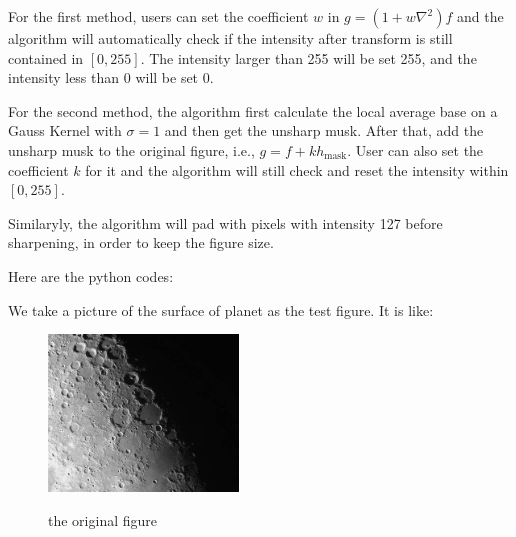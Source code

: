 \documentclass{article}
\begin{document}
For the first method, users can set the coefficient $w$ in $g = (1+w\nabla^2)f$
and the algorithm will automatically check if the intensity after transform 
is still contained in $[0,255]$. The intensity larger than 255 will be set 255,
and the intensity less than 0 will be set 0.

For the second method, the algorithm first calculate the local average base on 
a Gauss Kernel with $\sigma=1$ and then get the unsharp musk. 
After that, add the unsharp musk to the original figure, i.e., 
$g = f + kh_{\text{mask}}$.
User can also 
set the coefficient $k$ for it and the algorithm will still
check and reset the intensity within $[0,255]$.

Similaryly, the algorithm will pad with pixels with intensity 127 before sharpening,
in order to keep the figure size.

Here are the python codes:
 

We take a picture of the surface of planet as the test figure. It is like:
\begin{figure}[H]
	\centering
	{\includegraphics[width=0.45\textwidth]{test2.png}} 
	\caption{the original figure} \label{testFig2}
\end{figure}
\end{document}
